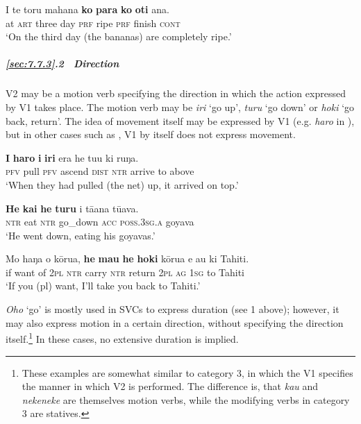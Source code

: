 \ea\label{ex:7.182}
\gll {\ꞌ}I te toru mahana \textbf{ko} \textbf{para} \textbf{ko} \textbf{oti} {\ꞌ}ana. \\
at \textsc{art} three day \textsc{prf} ripe \textsc{prf} finish \textsc{cont} \\

\glt 
‘On the third day (the bananas) are completely ripe.’ \textstyleExampleref{[R539-2.071]}
\z

\subparagraph{\ref{sec:7.7.3}.2~ Direction} V2 may be a motion verb specifying the direction in which the action expressed by V1 takes place. The motion verb may be \textit{iri} ‘go up’, \textit{turu} ‘go down’ or \textit{hoki} ‘go back, return’. The idea of movement itself may be expressed by V1 (e.g. \textit{haro} in ), but in other cases such as , V1 by itself does not express movement.

\ea\label{ex:7.183}
\gll \textbf{I} \textbf{haro} \textbf{i} \textbf{iri} era he tu{\ꞌ}u ki ruŋa. \\
\textsc{pfv} pull \textsc{pfv} ascend \textsc{dist} \textsc{ntr} arrive to above \\

\glt 
‘When they had pulled (the net) up, it arrived on top.’ \textstyleExampleref{[R304.136]} 
\z

\ea\label{ex:7.184}
\gll \textbf{He} \textbf{kai} \textbf{he} \textbf{turu} i tā{\ꞌ}ana tūava. \\
\textsc{ntr} eat \textsc{ntr} go\_down \textsc{acc} \textsc{poss.3sg.a} goyava \\

\glt 
‘He went down, eating his goyavas.’ \textstyleExampleref{[R245.024]} 
\z

\ea\label{ex:7.185}
\gll Mo haŋa o kōrua, \textbf{he} \textbf{ma{\ꞌ}u} \textbf{he} \textbf{hoki} kōrua e au ki Tahiti. \\
if want of \textsc{2pl} \textsc{ntr} carry \textsc{ntr} return \textsc{2pl} \textsc{ag} \textsc{1sg} to Tahiti \\

\glt
‘If you (pl) want, I’ll take you back to Tahiti.’ \textstyleExampleref{[R231.102]} 
\z

\textit{Oho} ‘go’ is mostly used in SVCs to express duration (see 1 above); however, it may also express motion in a certain direction, without specifying the direction itself.\footnote{\label{fn:378}These examples are somewhat similar to category 3, in which the V1 specifies the manner in which V2 is performed. The difference is, that \textit{kau} and \textit{nekeneke} are themselves motion verbs, while the modifying verbs in category 3 are statives.} In these cases, no extensive duration is implied.

